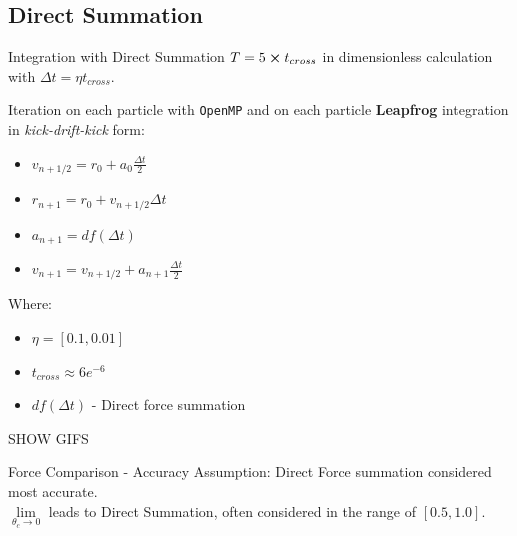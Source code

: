 \subsection{Direct Summation}
\begin{frame}{Integration with Direct Summation}
	$T = 5 \cross t_{cross}$ in dimensionless calculation with $\Delta t = \eta t_{cross}$. \bigskip

	Iteration on each particle with \texttt{OpenMP} and on each particle \textbf{Leapfrog} integration in \textit{kick-drift-kick} form:
	\begin{itemize}
		\item $v_{n+1/2} = r_0 + a_0  \frac{\Delta t}{2}$
		\item $r_{n+1} = r_0 + v_{n+1/2} \Delta t$
		\item $a_{n+1} = df(\Delta t)$
		\item $v_{n+1} = v_{n+1/2} + a_{n+1} \frac{\Delta t}{2}$
	\end{itemize} \bigskip

	{\footnotesize Where:
		\begin{itemize}
			\item $\eta = [0.1, 0.01]$
			\item $t_{cross} \approx 6e^{-6}$
			\item $df(\Delta t)$ - Direct force summation
		\end{itemize}
	}

	\bigskip\centering
	SHOW GIFS

\end{frame}

\begin{frame}{Force Comparison - Accuracy}
	Assumption: Direct Force summation considered most accurate. \\

	$\lim\limits_{\theta_c \to 0}$ leads to Direct Summation, often considered in the range of $[0.5, 1.0]$.
\end{frame}

